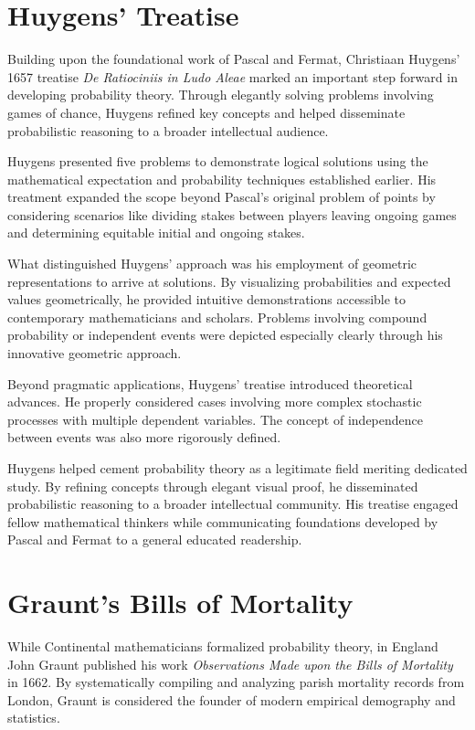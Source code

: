\section{Huygens' Treatise}

Building upon the foundational work of Pascal and Fermat, Christiaan Huygens' 1657 treatise \emph{De Ratiociniis in Ludo Aleae} marked an important step forward in developing probability theory. Through elegantly solving problems involving games of chance, Huygens refined key concepts and helped disseminate probabilistic reasoning to a broader intellectual audience.

Huygens presented five problems to demonstrate logical solutions using the mathematical expectation and probability techniques established earlier. His treatment expanded the scope beyond Pascal's original problem of points by considering scenarios like dividing stakes between players leaving ongoing games and determining equitable initial and ongoing stakes.

What distinguished Huygens' approach was his employment of geometric representations to arrive at solutions. By visualizing probabilities and expected values geometrically, he provided intuitive demonstrations accessible to contemporary mathematicians and scholars. Problems involving compound probability or independent events were depicted especially clearly through his innovative geometric approach.

Beyond pragmatic applications, Huygens' treatise introduced theoretical advances. He properly considered cases involving more complex stochastic processes with multiple dependent variables. The concept of independence between events was also more rigorously defined.

Huygens helped cement probability theory as a legitimate field meriting dedicated study. By refining concepts through elegant visual proof, he disseminated probabilistic reasoning to a broader intellectual community. His treatise engaged fellow mathematical thinkers while communicating foundations developed by Pascal and Fermat to a general educated readership. 

\section{Graunt's Bills of Mortality}

While Continental mathematicians formalized probability theory, in England John Graunt published his work \emph{Observations Made upon the Bills of Mortality} in 1662. By systematically compiling and analyzing parish mortality records from London, Graunt is considered the founder of modern empirical demography and statistics.

